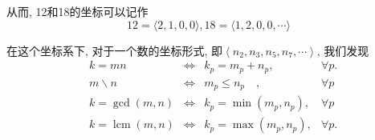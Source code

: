 \documentclass{ctexart}
\begin{document}
从而, 12和18的坐标可以记作
$$
12=\langle 2,1,0,0\rangle, 18=\langle 1,2,0,0, \cdots\rangle
$$

在这个坐标系下, 对于一个数的坐标形式, 即$\left\langle n_2, n_3, n_5, n_7, \cdots\right\rangle$, 我们发现
$$\begin{aligned} & k=m n &\Leftrightarrow& k_p=m_p+n_p, &\forall p . \\ & m \backslash n & \Leftrightarrow& m_p\leq n_p\quad, &\forall p \\ & k=\operatorname{gcd}(m, n) &\Leftrightarrow& k_p=\min \left(m_p, n_p\right), &\forall p \\ & k=\operatorname{lcm}(m, n) &\Leftrightarrow& k_p=\max \left(m_p, n_p\right), &\forall p .\end{aligned}$$
\end{document}
